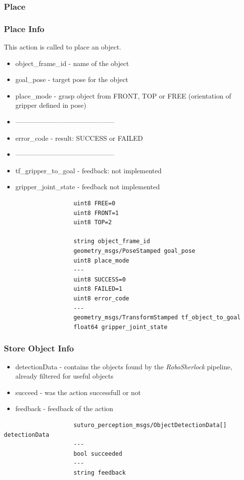 \documentclass[main.tex]{subfiles}
\begin{document}
				\subsubsection{Place}
				\label{msg_place}
				\subsubsection{Place Info}
				This action is called to place an object.
				\begin{itemize}
					\item object\_frame\_id - name of the object
					\item goal\_pose - target pose for the object
					\item place\_mode - grasp object from FRONT, TOP or FREE (orientation of gripper defined in pose)
					\item --------------------------------------------
					\item error\_code - result: SUCCESS or FAILED
					\item --------------------------------------------
					\item tf\_gripper\_to\_goal - feedback: not implemented
					\item gripper\_joint\_state - feedback not implemented
				\end{itemize}
					\begin{lstlisting}
					uint8 FREE=0
					uint8 FRONT=1
					uint8 TOP=2
		
					string object_frame_id
					geometry_msgs/PoseStamped goal_pose
					uint8 place_mode
					---
					uint8 SUCCESS=0
					uint8 FAILED=1
					uint8 error_code
					---
					geometry_msgs/TransformStamped tf_object_to_goal
					float64 gripper_joint_state
					\end{lstlisting}
				\subsubsection{Store Object Info}
				\label{msg_store_object_info}
				\begin{itemize}
					\item detectionData - contains the objects found by the \textit{RoboSherlock} pipeline, already filtered for useful objects
					\item succeed - was the action successfull or not
					\item feedback - feedback of the action 
				\end{itemize}
					\begin{lstlisting}
					suturo_perception_msgs/ObjectDetectionData[] detectionData
					---
					bool succeeded
					---
					string feedback
					\end{lstlisting}
\end{document}
